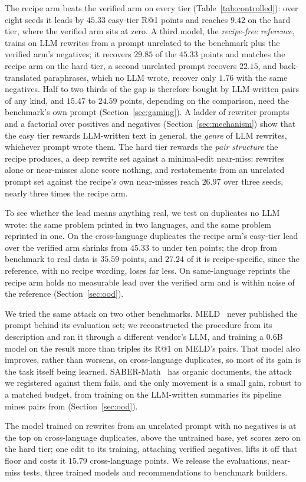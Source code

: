 The recipe arm beats the verified arm on every tier (Table~\ref{tab:controlled}): over eight seeds it leads by $45.33$ easy-tier R@1 points and reaches $9.42$ on the hard tier, where the verified arm sits at zero. A third model, the \emph{recipe-free reference}, trains on LLM rewrites from a prompt unrelated to the benchmark plus the verified arm's negatives; it recovers $29.85$ of the $45.33$ points and matches the recipe arm on the hard tier, a second unrelated prompt recovers $22.15$, and back-translated paraphrases, which no LLM wrote, recover only $1.76$ with the same negatives. Half to two thirds of the gap is therefore bought by LLM-written pairs of any kind, and $15.47$ to $24.59$ points, depending on the comparison, need the benchmark's own prompt (Section~\ref{sec:gaming}). A ladder of rewriter prompts and a factorial over positives and negatives (Section~\ref{sec:mechanism}) show that the easy tier rewards LLM-written text in general, the \emph{genre} of LLM rewrites, whichever prompt wrote them. The hard tier rewards the \emph{pair structure} the recipe produces, a deep rewrite set against a minimal-edit near-miss: rewrites alone or near-misses alone score nothing, and restatements from an unrelated prompt set against the recipe's own near-misses reach $26.97$ over three seeds, nearly three times the recipe arm.

To see whether the lead means anything real, we test on duplicates no LLM wrote: the same problem printed in two languages, and the same problem reprinted in one. On the cross-language duplicates the recipe arm's easy-tier lead over the verified arm shrinks from $45.33$ to under ten points; the drop from benchmark to real data is $35.59$ points, and $27.24$ of it is recipe-specific, since the reference, with no recipe wording, loses far less. On same-language reprints the recipe arm holds no measurable lead over the verified arm and is within noise of the reference (Section~\ref{sec:ood}).

We tried the same attack on two other benchmarks. MELD~\citep{ye2026meld} never published the prompt behind its evaluation set; we reconstructed the procedure from its description and ran it through a different vendor's LLM, and training a $0.6$B model on the result more than triples its R@1 on MELD's pairs. That model also improves, rather than worsens, on cross-language duplicates, so most of its gain is the task itself being learned. SABER-Math~\citep{georgiev2026saber} has organic documents, the attack we registered against them fails, and the only movement is a small gain, robust to a matched budget, from training on the LLM-written summaries its pipeline mines pairs from (Section~\ref{sec:ood}).

The model trained on rewrites from an unrelated prompt with no negatives is at the top on cross-language duplicates, above the untrained base, yet scores zero on the hard tier; one edit to its training, attaching verified negatives, lifts it off that floor and costs it $15.79$ cross-language points. We release the evaluations, near-miss tests, three trained models and recommendations to benchmark builders.
